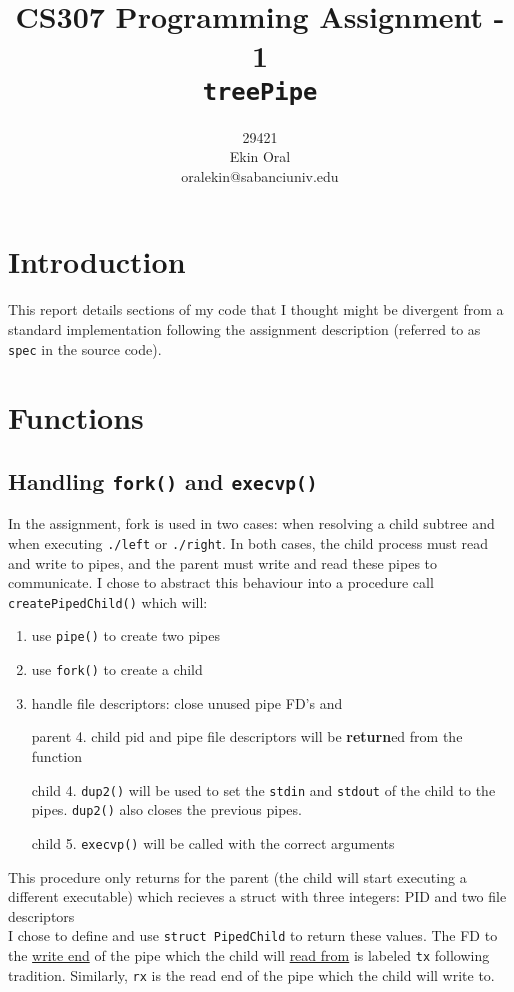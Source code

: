 \documentclass{article}
\begin{document}
\title{{\Large CS307 Programming Assignment - 1}\\\texttt{treePipe}}
\author{29421\\Ekin Oral\\oralekin@sabanciuniv.edu}
\maketitle
\begin{multicols}{2}
\section{Introduction}
This report details sections of my code that I thought might be divergent from a standard implementation following the assignment description (referred to as \verb|spec| in the source code).
\section{Functions}
\subsection[createPipedChild()]{Handling \texttt{fork()} and \texttt{execvp()} }
In the assignment, fork is used in two cases: when resolving a child subtree and when executing \verb|./left| or \verb|./right|. In both cases, the child process must read and write to pipes, and the parent must write and read these pipes to communicate. I chose to abstract this behaviour into a procedure call \verb|createPipedChild()| which will: 
\begin{enumerate}
	\item use \verb|pipe()| to create two pipes
	\item use \verb|fork()| to create a child
	\item handle file descriptors: close unused pipe FD's and 

		\item[parent 4.] child pid and pipe file descriptors will be \textbf{return}ed from the function
		\item[child 4.] \verb|dup2()| will be used to set the \verb|stdin| and \verb|stdout| of the child to the pipes. \verb|dup2()| also closes the previous pipes.  

	\item[child 5.] \verb|execvp()| will be called with the correct arguments
\end{enumerate}
This procedure only returns for the parent (the child will start executing a different executable) which recieves a struct with three integers: PID and two file descriptors\\
I chose to define and use \verb|struct PipedChild| to return these values. The FD to the \underline{write end} of the pipe which the child will \underline{read from} is labeled \verb|tx| following tradition. Similarly, \verb|rx| is the read end of the pipe which the child will write to.

\end{multicols}
\end{document}
